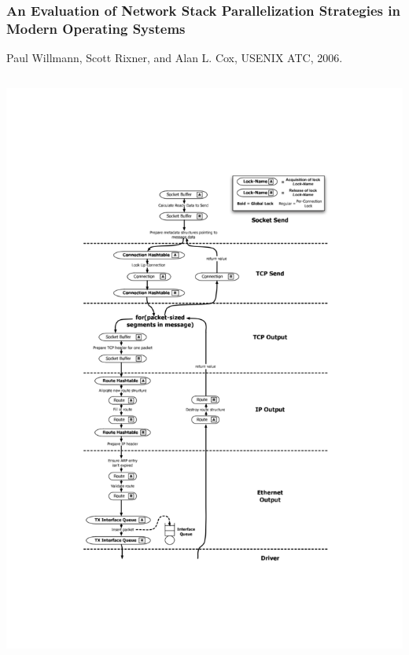 \begin{frame}
  \frametitle{An Evaluation of Network Stack Parallelization Strategies in
    Modern Operating Systems}

  Paul Willmann, Scott Rixner, and Alan L. Cox, USENIX ATC, 2006.

  \smallskip

  \begin{columns}[T]
      \begin{center}
	\includegraphics[width=1.1\textwidth]{../../figures/tcp-mp-strategies.pdf}
      \end{center}



\end{columns}
\end{frame}
